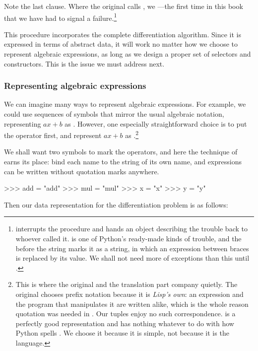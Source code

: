 \noindent
Note the last clause.  Where the original calls , we
---the first time in this book that we have had to signal a
failure.\footnote{ interrupts the procedure and hands an object
describing the trouble back to whoever called it.   is one of
Python's ready-made kinds of trouble, and the  before the string marks
it as a  string, in which an expression between braces is
replaced by its value.  We shall not need more of exceptions than this until
.}

This  procedure incorporates the complete differentiation
algorithm.  Since it is expressed in terms of abstract data, it will work no
matter how we choose to represent algebraic expressions, as long as we design a
proper set of selectors and constructors.  This is the issue we must address
next.

\subsubsection*{Representing algebraic expressions}

We can imagine many ways to represent algebraic expressions.  For example, we
could use sequences of symbols that mirror the usual algebraic notation,
representing \( ax + b \) as .  However, one
especially straightforward choice is to put the operator first, and represent
\( ax + b \) as .\footnote{This is where the
original and the translation part company quietly.  The original chooses prefix
notation because it is \emph{Lisp's own}: an expression and the program that
manipulates it are written alike, which is the whole reason quotation was
needed in .  Our tuples enjoy no such correspondence.
 is a perfectly good representation and has nothing
whatever to do with how Python spells .  We choose it because it
is simple, not because it is the language.}

We shall want two symbols to mark the operators, and here the technique of
 earns its place: bind each name to the string of its own
name, and expressions can be written without quotation marks anywhere.

\begin{codeBlock}
>>> add = "add"
>>> mul = "mul"
>>> x = "x"
>>> y = "y"
\end{codeBlock}

\noindent
Then our data representation for the differentiation problem is as follows:

